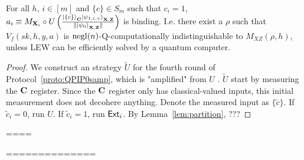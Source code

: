 


\begin{lemma} 
For all $h$, $i\in [m]$ and $\{c\}\in S_m$ such that $c_i = 1$, $a_i \equiv  M_{\mathbf{X}_i}\circ U\left(\frac{\ket{\{c\}}_{\mathbf{C}}\ket{\psi_{1,i,\gamma}}_{\mathbf{X},\mathbf{Z}}}{\|\ket{\psi_0}_{\mathbf{X},\mathbf{Z}}\|}\right)$ is binding. I.e. there exist a $\rho$ such that $V_f(sk,h,y,a)$ is $\operatorname{negl}(n)$-Q-computationally indistinguishable to $M_{XZ}(\rho,h)$, unless LEW can be efficiently solved by a quantum computer.
\end{lemma}
\begin{proof}
We construct an  strategy $\tilde{U}$ for the fourth round of Protocol~\ref{proto:QPIP0samp}, which is "amplified" from $U$ .
$\tilde{U}$ start by measuring the $\mathbf{C}$ register. Since the $\mathbf{C}$ register only has classical-valued inputs, this initial measurement does not decohere anything. Denote the measured input as $\{\tilde{c}\}$. If $\tilde{c}_i=0$, run $U$. If $\tilde{c}_i=1$, run $\mathsf{Ext}_i$. By Lemma~\ref{lem:partition}, ???

\end{proof}

====


==============

